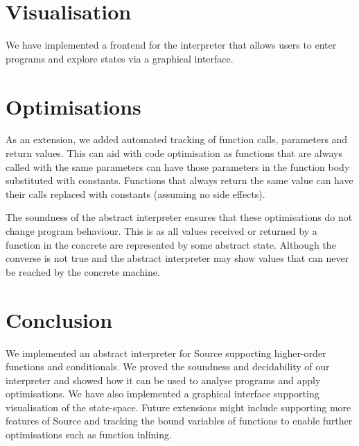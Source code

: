 \documentclass[12pt]{article}
\begin{document}
\section{Visualisation}
We have implemented a frontend for the interpreter that allows users to enter programs and explore states via a graphical interface.


\section{Optimisations}
As an extension, we added automated tracking of function calls, parameters and return values. This can aid with code optimisation as functions that are always called with the same parameters can have those parameters in the function body substituted with constants. Functions that always return the same value can have their calls replaced with constants (assuming no side effects).

The soundness of the abstract interpreter ensures that these optimisations do not change program behaviour. This is as all values received or returned by a function in the concrete are represented by some abstract state. Although the converse is not true and the abstract interpreter may show values that can never be reached by the concrete machine.


\section{Conclusion}
We implemented an abstract interpreter for Source supporting higher-order functions and conditionals. We proved the soundness and decidability of our interpreter and showed how it can be used to analyse programs and apply optimisations. We have also implemented a graphical interface supporting visualisation of the state-space. Future extensions might include supporting more features of Source and tracking the bound variables of functions to enable further optimisations such as function inlining. 



\end{document}

